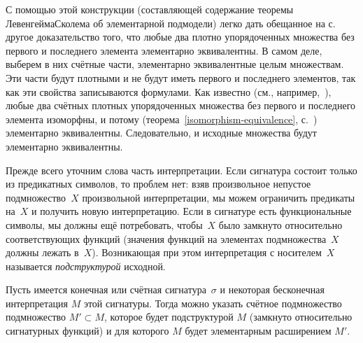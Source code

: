 С помощью этой конструкции (составляющей содержание теоремы
Левенгейма\ч Сколема об элементарной подмодели) легко дать
обещанное на с.~\pageref{dense-sets-elementary-equivalence}
другое доказательство того, что любые два плотно упорядоченных
множества без первого и последнего элемента элементарно
эквивалентны. В самом деле, выберем в них счётные
части, элементарно эквивалентные целым множествам. Эти части
будут плотными и не будут иметь первого и последнего элементов,
так как эти свойства записываются формулами. Как известно (см.,
например,~\cite{naive-set-theory}), любые два счётных плотных
упорядоченных множества без первого и последнего элемента
изоморфны, и потому (теорема~\ref{isomorphism-equivalence},
с.~\pageref{isomorphism-equivalence}) элементарно эквивалентны.
Следовательно, и исходные множества будут элементарно
эквивалентны.

Прежде всего уточним слова  часть
интерпретации. Если сигнатура состоит только из предикатных
символов, то проблем нет: взяв произвольное непустое
подмножество~$X$ произвольной интерпретации, мы можем ограничить
предикаты на~$X$ и получить новую интерпретацию. Если в
сигнатуре есть функциональные символы, мы должны ещё
потребовать, чтобы~$X$ было замкнуто относительно
соответствующих функций (значения функций на элементах
подмножества~$X$ должны лежать в~$X$). Возникающая при этом
интерпретация с носителем~$X$ называется \emph{подструктурой}
исходной.

\begin{theorem}
%
        \label{lowenheim-skolem-theorem}%
Пусть имеется конечная или счётная сигнатура~$\sigma$ и
некоторая бесконечная интерпретация $M$ этой сигнатуры. Тогда
можно указать счётное подмножество подмножество $M'\subset M$,
которое будет подструктурой $M$ (замкнуто относительно
сигнатурных функций) и для которого $M$ будет элементарным
расширением $M'$.
\end{theorem}

